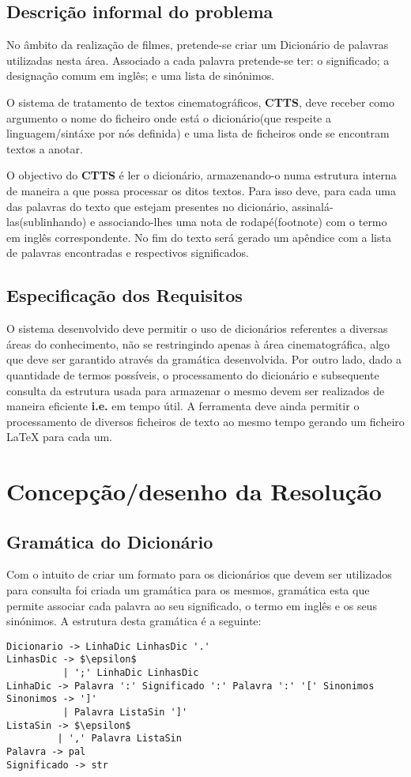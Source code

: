 \documentclass{llncs}
\begin{document}
\subsection{Descrição informal do problema}
No âmbito da realização de filmes, pretende-se criar um Dicionário de palavras utilizadas nesta área. Associado a cada palavra pretende-se ter: o significado; a designação comum em inglês; e uma lista de sinónimos.

O sistema de tratamento de textos cinematográficos, \textbf{CTTS}, deve receber como argumento o nome do ficheiro onde está o dicionário(que respeite a linguagem/sintáxe por nós definida) e uma lista de ficheiros onde se encontram textos a anotar.

O objectivo do \textbf{CTTS} é ler o dicionário, armazenando-o numa estrutura interna de maneira a que possa processar os ditos textos. Para isso deve, para cada uma das palavras do texto que estejam presentes no dicionário, assinalá-las(sublinhando) e associando-lhes uma nota de rodapé(footnote) com o termo em inglês correspondente. No fim do texto será gerado um apêndice com a lista de palavras encontradas e respectivos significados.

\subsection{Especificação dos Requisitos}
O sistema desenvolvido deve permitir o uso de dicionários referentes a diversas áreas do conhecimento, não se restringindo apenas à área cinematográfica, algo que deve ser garantido através da gramática desenvolvida. Por outro lado, dado a quantidade de termos possíveis, o processamento do dicionário e subsequente consulta da estrutura usada para armazenar o mesmo devem ser realizados de maneira eficiente \textbf{i.e.} em tempo útil. A ferramenta deve ainda permitir o processamento de diversos ficheiros de texto ao mesmo tempo gerando um ficheiro \LaTeX{} para cada um.

\section{Concepção/desenho da Resolução}

\subsection{Gramática do Dicionário}
Com o intuito de criar um formato para os dicionários que devem ser utilizados para consulta foi criada um gramática para os mesmos, gramática esta que permite associar cada palavra ao seu significado, o termo em inglês e os seus sinónimos. 
A estrutura desta gramática é a seguinte:
\begin{lstlisting}[mathescape]
Dicionario -> LinhaDic LinhasDic '.' 
LinhasDic -> $\epsilon$ 
          | ';' LinhaDic LinhasDic 
LinhaDic -> Palavra ':' Significado ':' Palavra ':' '[' Sinonimos 
Sinonimos -> ']' 
          | Palavra ListaSin ']' 
ListaSin -> $\epsilon$ 
         | ',' Palavra ListaSin 
Palavra -> pal 
Significado -> str 
\end{lstlisting}
\end{document}
